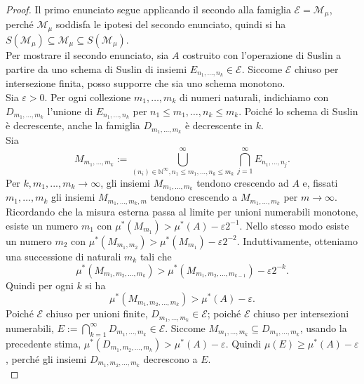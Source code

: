 \documentclass[a4paper, twoside]{article}
\newcommand{\<}{\langle}
\renewcommand{\>}{\rangle}
\begin{document}
\begin{proof}
	Il primo enunciato segue applicando il secondo alla famiglia $\mathcal{E}=\mathcal{M}_{\mu}$, perché $\mathcal{M}_{\mu}$ soddisfa le ipotesi del secondo enunciato, quindi si ha $S(\mathcal{M}_{\mu}) \subseteq \mathcal{M}_{\mu} \subseteq S(\mathcal{M}_{\mu})$.\\
	Per mostrare il secondo enunciato, sia $A$ costruito con l'operazione di Suslin a partire da uno schema di Suslin di insiemi $E_{n_{1}, \ldots, n_{k}} \in \mathcal{E}$. Siccome $\mathcal{E}$ chiuso per intersezione finita, posso supporre che sia uno schema monotono.\\
	Sia $\varepsilon>0$. Per ogni collezione $m_{1}, \ldots, m_{k}$ di numeri naturali, indichiamo con $D_{m_{1}, \ldots, m_{k}}$ l'unione di $E_{n_{1}, \ldots, n_{k}}$ per $n_{1} \leq m_{1}, \ldots, n_{k} \leq m_{k}$. Poiché lo schema di Suslin è decrescente, anche la famiglia $D_{m_1,...,m_k}$ è decrescente in $k$.\\
	Sia
	$$
	M_{m_{1}, \ldots, m_{k}}:=\bigcup_{\left(n_{i}\right) \in \mathbb{N}^{\infty}, n_{1} \leq m_{1}, \ldots, n_{k} \leq m_{k}}^{\infty} \bigcap_{j=1}^{\infty} E_{n_{1}, \ldots, n_{j}} .
	$$
	Per $k, m_1,...,m_k \rightarrow \infty$, gli insiemi $M_{m_1,...,m_k}$ tendono crescendo ad $A$ e, fissati $m_{1}, \ldots, m_{k}$ gli insiemi $M_{m_{1}, \ldots, m_{k}, m}$  tendono crescendo a $M_{m_{1}, \ldots, m_{k}}$ per $m \rightarrow \infty$.\\
	Ricordando che la misura esterna passa al limite per unioni numerabili monotone, esiste un numero $m_{1}$ con $\mu^{*}\left(M_{m_{1}}\right)>\mu^{*}(A)-\varepsilon 2^{-1}$. Nello stesso modo esiste un numero $m_{2}$ con $\mu^{*}\left(M_{m_{1}, m_{2}}\right)>\mu^{*}\left(M_{m_{1}}\right)-\varepsilon 2^{-2}$. Induttivamente, otteniamo una successione di naturali $m_{k}$ tali che
	$$
	\mu^{*}\left(M_{m_{1}, m_{2}, \ldots, m_{k}}\right)>\mu^{*}\left(M_{m_{1}, m_{2}, \ldots, m_{k-1}}\right)-\varepsilon 2^{-k} .
	$$
	Quindi per ogni $k$ si ha
	$$
	\mu^{*}\left(M_{m_{1}, m_{2}, \ldots, m_{k}}\right)>\mu^{*}(A)-\varepsilon .
	$$
	Poiché $\mathcal{E}$ chiuso per unioni finite, $D_{m_{1}, \ldots, m_{k}} \in \mathcal{E}$; poiché $\mathcal{E}$ chiuso per intersezioni numerabili, $E:=\bigcap_{k=1}^{\infty} D_{m_{1}, \ldots, m_{k}} \in \mathcal{E}$. Siccome $M_{m_{1}, \ldots, m_{k}} \subseteq D_{m_{1}, \ldots, m_{k}}$, usando la precedente stima, $\mu^{*}\left(D_{m_{1}, m_{2}, \ldots, m_{k}}\right)>\mu^{*}(A)-\varepsilon$. Quindi $\mu(E) \geq \mu^{*}(A)-\varepsilon$, perché gli insiemi $D_{m_{1}, m_{2}, \ldots, m_{k}}$ decrescono a $E$.\\

\end{proof}
\end{document}
